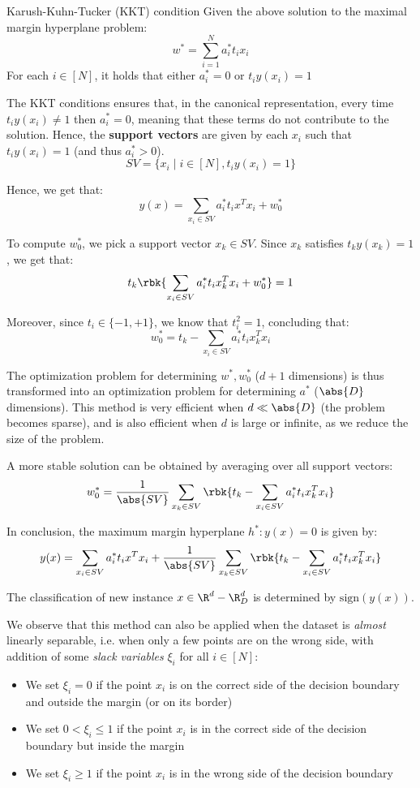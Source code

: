 \documentclass[a4paper, 12pt]{report}
\begin{document}
    \begin{framedprop}{Karush-Kuhn-Tucker (KKT) condition}
        Given the above solution to the maximal margin hyperplane problem:
        \[w^* = \sum_{i = 1}^{N} a_i^* t_i x_i\]
        For each $i \in [N]$, it holds that either $a_i^* = 0$ or $t_i y(x_i) = 1$
    \end{framedprop}

    The KKT conditions ensures that, in the canonical representation, every time $t_i y(x_i) \neq 1$ then $a_i^* = 0$, meaning that these terms do not contribute to the solution. Hence, the \textbf{support vectors} are given by each $x_i$ such that $t_i y(x_i) = 1$ (and thus $a_i^* > 0$).
    \[SV = \{x_i \mid i \in [N], t_i y(x_i) = 1\}\]

    Hence, we get that:
    \[y(x) = \sum_{x_i \in SV} a_i^* t_i x^T x_i + w_0^*\]
    
    To compute $w_0^*$, we pick a support vector $x_k \in SV$. Since $x_k$ satisfies $t_ky(x_k) = 1$, we get that:
    \[t_k \rbk{\sum_{x_i \in SV} a_i^* t_i x_k^T x_i + w_0^*} = 1\]

    Moreover, since $t_i \in \{-1,+1\}$, we know that $t_i^2 = 1$, concluding that:
    \[w_0^* = t_k - \sum_{x_i \in SV} a_i^* t_i x_k^T x_i\]

    The optimization problem for determining $w^*,w_0^*$ ($d + 1$ dimensions) is thus transformed into an optimization problem for determining $a^*$ ($\abs{D}$ dimensions). This method is very efficient when $d \ll \abs{D}$ (the problem becomes sparse), and is also efficient when $d$ is large or infinite, as we reduce the size of the problem.

    A more stable solution can be obtained by averaging over all support vectors:
    \[w_0^* = \frac{1}{\abs{SV}} \sum_{x_k \in SV} \rbk{t_k - \sum_{x_i \in SV} a_i^* t_i x_k^T x_i}\]
    
    In conclusion, the maximum margin hyperplane $h^* : y(x) = 0$ is given by:
    \[y(x) = \sum_{x_i \in SV} a_i^* t_i x^T x_i + \frac{1}{\abs{SV}} \sum_{x_k \in SV} \rbk{t_k - \sum_{x_i \in SV} a_i^* t_i x_k^T x_i}\]

    The classification of new instance $x \in \R^d-\R^d_D$ is determined by $\mathrm{sign}(y(x))$. 

    We observe that this method can also be applied when the dataset is \textit{almost} linearly separable, i.e. when only a few points are on the wrong side, with addition of some \textit{slack variables} $\xi_i$ for all $i \in [N]$:
    \begin{itemize}
        \item We set $\xi_i = 0$ if the point $x_i$ is on the correct side of the decision boundary and outside the margin (or on its border)
        \item We set $0 < \xi_i \leq 1$ if the point $x_i$ is in the correct side of the decision boundary but inside the margin
        \item We set $\xi_i \geq 1$ if the point $x_i$ is in the wrong side of the decision boundary
    \end{itemize}
\end{document}
